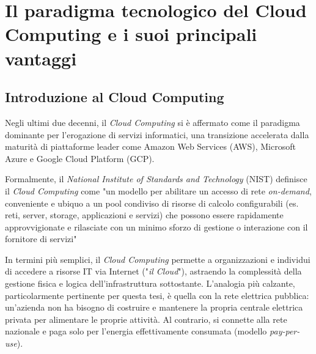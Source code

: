 \chapter{Il paradigma tecnologico del Cloud Computing e i suoi principali vantaggi}
\label{allegato:Secondo-allegato}




\section{Introduzione al Cloud Computing}


Negli ultimi due decenni, il \textit{Cloud Computing} si è affermato come il paradigma dominante per l'erogazione di servizi informatici, una transizione accelerata dalla maturità di piattaforme leader come Amazon Web Services (AWS), Microsoft Azure e Google Cloud Platform (GCP).


Formalmente, il \textit{National Institute of Standards and Technology} (NIST) definisce il \textit{Cloud Computing} come "un modello per abilitare un accesso di rete \textit{on-demand}, conveniente e ubiquo a un pool condiviso di risorse di calcolo configurabili (es. reti, server, storage, applicazioni e servizi) che possono essere rapidamente approvvigionate e rilasciate con un minimo sforzo di gestione o interazione con il fornitore di servizi" \cite{NIST-cloud-computer}



In termini più semplici, il \textit{Cloud Computing} permette a organizzazioni e individui di accedere a risorse IT via Internet ("\textit{il Cloud}"), astraendo la complessità della gestione fisica e logica dell'infrastruttura sottostante. L'analogia più calzante, particolarmente pertinente per questa tesi, è quella con la rete elettrica pubblica: un'azienda non ha bisogno di costruire e mantenere la propria centrale elettrica privata per alimentare le proprie attività. Al contrario, si connette alla rete nazionale e paga solo per l'energia effettivamente consumata (modello \textit{pay-per-use}).



